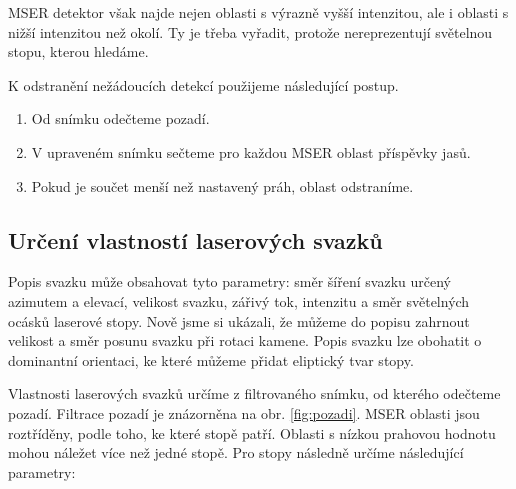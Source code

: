 MSER detektor však najde nejen oblasti s výrazně vyšší intenzitou, ale i oblasti s nižší intenzitou než okolí. Ty je třeba vyřadit, protože nereprezentují světelnou stopu, kterou hledáme. 

K odstranění nežádoucích detekcí použijeme následující postup. 
\begin{enumerate}
\item Od snímku odečteme pozadí.

\item V upraveném snímku sečteme pro každou MSER oblast příspěvky jasů. 

\item Pokud je součet menší než nastavený práh, oblast odstraníme.  
\end{enumerate}
 	      

\subsection*{Určení vlastností laserových svazků}
Popis svazku může obsahovat tyto parametry: směr šíření svazku určený azimutem a elevací, velikost svazku, zářivý tok, intenzitu a směr světelných ocásků laserové stopy. Nově jsme si ukázali, že můžeme do popisu zahrnout velikost a směr posunu svazku při rotaci kamene. Popis svazku lze obohatit o dominantní orientaci, ke které můžeme přidat eliptický tvar stopy. 

Vlastnosti laserových svazků určíme z filtrovaného snímku, od kterého odečteme pozadí. Filtrace pozadí je znázorněna na obr. \ref{fig:pozadi}. MSER oblasti jsou roztříděny, podle toho, ke které stopě patří. Oblasti s nízkou prahovou hodnotu mohou náležet více než jedné stopě. Pro stopy   následně určíme následující parametry:

